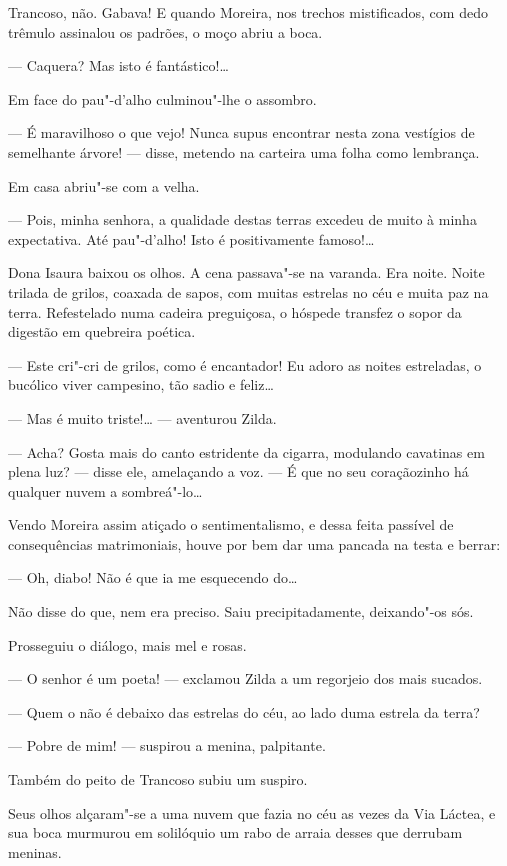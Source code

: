Trancoso, não. Gabava! E quando Moreira, nos trechos mistificados, com
dedo trêmulo assinalou os padrões, o moço abriu a boca.

--- Caquera? Mas isto é fantástico!\ldots{}

Em face do pau"-d'alho culminou"-lhe o assombro.

--- É maravilhoso o que vejo! Nunca supus encontrar nesta zona vestígios
de semelhante árvore! --- disse, metendo na carteira uma folha como
lembrança.

Em casa abriu"-se com a velha.

--- Pois, minha senhora, a qualidade destas terras excedeu de muito à
minha expectativa. Até pau"-d'alho! Isto é positivamente famoso!\ldots{}

Dona Isaura baixou os olhos. A cena passava"-se na varanda. Era noite.
Noite trilada de grilos, coaxada de sapos, com muitas estrelas no céu e
muita paz na terra. Refestelado numa cadeira preguiçosa, o hóspede
transfez o sopor da digestão em quebreira poética.

--- Este cri"-cri de grilos, como é encantador! Eu adoro as noites
estreladas, o bucólico viver campesino, tão sadio e feliz\ldots{}

--- Mas é muito triste!\ldots{} --- aventurou Zilda.

--- Acha? Gosta mais do canto estridente da cigarra, modulando cavatinas
em plena luz? --- disse ele, amelaçando a voz. --- É que no seu
coraçãozinho há qualquer nuvem a sombreá"-lo\ldots{}

Vendo Moreira assim atiçado o sentimentalismo, e dessa feita passível de
consequências matrimoniais, houve por bem dar uma pancada na testa e
berrar:

--- Oh, diabo! Não é que ia me esquecendo do\ldots{}

Não disse do que, nem era preciso. Saiu precipitadamente, deixando"-os
sós.

Prosseguiu o diálogo, mais mel e rosas.

--- O senhor é um poeta! --- exclamou Zilda a um regorjeio dos mais
sucados.

--- Quem o não é debaixo das estrelas do céu, ao lado duma estrela da
terra?

--- Pobre de mim! --- suspirou a menina, palpitante.

Também do peito de Trancoso subiu um suspiro.

Seus olhos alçaram"-se a uma nuvem que fazia no céu as vezes da Via
Láctea, e sua boca murmurou em solilóquio um rabo de arraia desses que
derrubam meninas.

